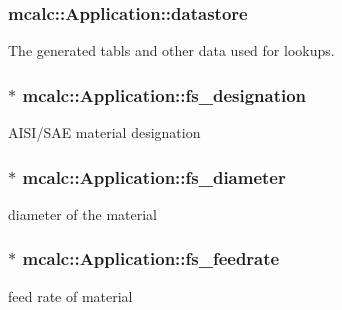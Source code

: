 \subsubsection[{\texorpdfstring{datastore}{datastore}}]{ mcalc\+::\+Application\+::datastore\hspace{0.3cm}{\ttfamily [protected]}}\hypertarget{classmcalc_1_1Application_a2fa9d06d424a8def5ea70fa07e844b9c}{}\label{classmcalc_1_1Application_a2fa9d06d424a8def5ea70fa07e844b9c}
The generated tabls and other data used for lookups. 
\subsubsection[{\texorpdfstring{fs\+\_\+designation}{fs_designation}}]{$\ast$ mcalc\+::\+Application\+::fs\+\_\+designation\hspace{0.3cm}{\ttfamily [protected]}}\hypertarget{classmcalc_1_1Application_a5dd81c68d005acedeb18336bfe87cdcb}{}\label{classmcalc_1_1Application_a5dd81c68d005acedeb18336bfe87cdcb}
A\+I\+S\+I/\+S\+AE material designation 
\subsubsection[{\texorpdfstring{fs\+\_\+diameter}{fs_diameter}}]{$\ast$ mcalc\+::\+Application\+::fs\+\_\+diameter\hspace{0.3cm}{\ttfamily [protected]}}\hypertarget{classmcalc_1_1Application_aa5fa7c6a44d89abb85a6947767261698}{}\label{classmcalc_1_1Application_aa5fa7c6a44d89abb85a6947767261698}
diameter of the material 
\subsubsection[{\texorpdfstring{fs\+\_\+feedrate}{fs_feedrate}}]{$\ast$ mcalc\+::\+Application\+::fs\+\_\+feedrate\hspace{0.3cm}{\ttfamily [protected]}}\hypertarget{classmcalc_1_1Application_a7cd486d0bde1d1ecdf82c41a5f2e6d53}{}\label{classmcalc_1_1Application_a7cd486d0bde1d1ecdf82c41a5f2e6d53}
feed rate of material 
